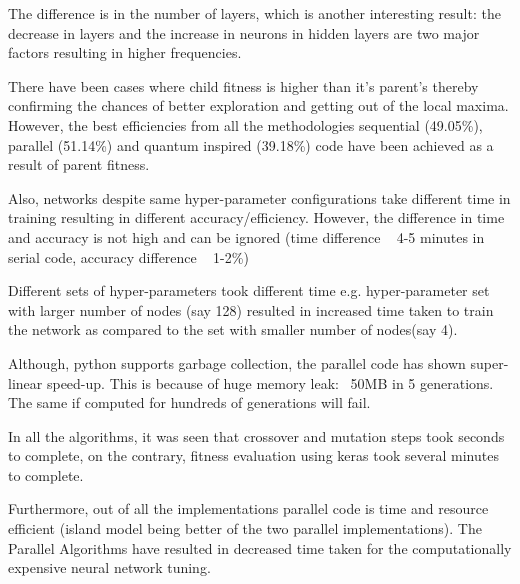 The difference is in the number of layers, which is another interesting result: the decrease in layers and the increase in neurons in hidden layers are two major factors resulting in higher frequencies.


There have been cases where child fitness is higher than it's parent's thereby confirming the chances of better exploration and getting out of the local maxima. However, the best efficiencies from all the methodologies sequential (49.05\%), parallel (51.14\%) and quantum inspired (39.18\%) code have been achieved as a result of parent fitness.


Also, networks despite same hyper-parameter configurations take different time in training resulting in different accuracy/efficiency. However, the difference in time and accuracy is not high and can be ignored (time difference ~ 4-5 minutes in serial code, accuracy difference ~ 1-2\%)


Different sets of hyper-parameters took different time e.g. hyper-parameter set with larger number of nodes (say 128) resulted in increased time taken to train the network as compared to the set with smaller number of nodes(say 4).


Although, python supports garbage collection, the parallel code has shown super-linear speed-up. This is because of huge memory leak: ~50MB in 5 generations. The same if computed for hundreds of generations will fail.



In all the algorithms, it was seen that crossover and mutation steps took seconds to complete, on the contrary, fitness evaluation using keras took several minutes to complete. 


 
Furthermore, out of all the implementations parallel code is time and resource efficient (island model being better of the two parallel implementations). The Parallel Algorithms have resulted in decreased time taken for the computationally expensive neural network tuning.

